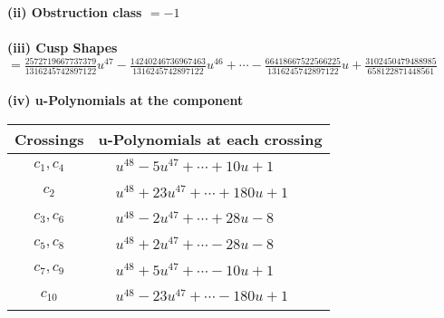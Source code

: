 \documentclass[1p]{elsarticle_modified}
\theoremstyle{definition}
\begin{document}
\flushleft \textbf{(ii) Obstruction class $= -1$}\\~\\
\flushleft \textbf{(iii) Cusp Shapes $= \frac{2572719667737379}{1316245742897122} u^{47}-\frac{14240246736967463}{1316245742897122} u^{46}+\cdots-\frac{66418667522566225}{1316245742897122} u+\frac{3102450479488985}{658122871448561}$}\\~\\
\newpage\renewcommand{\arraystretch}{1}
\flushleft \textbf{(iv) u-Polynomials at the component}\newline \\
\begin{tabular}{m{50pt}|m{274pt}}
Crossings & \hspace{64pt}u-Polynomials at each crossing \\
\hline $$\begin{aligned}c_{1},c_{4}\end{aligned}$$&$\begin{aligned}
&u^{48}-5 u^{47}+\cdots+10 u+1
\end{aligned}$\\
\hline $$\begin{aligned}c_{2}\end{aligned}$$&$\begin{aligned}
&u^{48}+23 u^{47}+\cdots+180 u+1
\end{aligned}$\\
\hline $$\begin{aligned}c_{3},c_{6}\end{aligned}$$&$\begin{aligned}
&u^{48}-2 u^{47}+\cdots+28 u-8
\end{aligned}$\\
\hline $$\begin{aligned}c_{5},c_{8}\end{aligned}$$&$\begin{aligned}
&u^{48}+2 u^{47}+\cdots-28 u-8
\end{aligned}$\\
\hline $$\begin{aligned}c_{7},c_{9}\end{aligned}$$&$\begin{aligned}
&u^{48}+5 u^{47}+\cdots-10 u+1
\end{aligned}$\\
\hline $$\begin{aligned}c_{10}\end{aligned}$$&$\begin{aligned}
&u^{48}-23 u^{47}+\cdots-180 u+1
\end{aligned}$\\
\hline
\end{tabular}\\~\\
\end{document}
